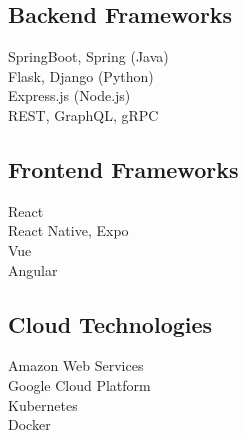 \documentclass[letterpaper]{deedy-resume-openfont} %
\begin{document}
\begin{minipage}[t]{0.24\textwidth}
\sectionsep %

\subsection{Backend Frameworks}
\textbullet{} SpringBoot, Spring (Java)\\
\textbullet{} Flask, Django (Python)\\
\textbullet{} Express.js (Node.js)\\
\textbullet{} REST, GraphQL, gRPC\\

\sectionsep %

\subsection{Frontend Frameworks}
\textbullet{} React\\
\textbullet{} React Native, Expo\\
\textbullet{} Vue\\
\textbullet{} Angular\\

\sectionsep %

\subsection{Cloud Technologies}
\textbullet{} Amazon Web Services\\
\textbullet{} Google Cloud Platform\\
\textbullet{} Kubernetes\\
\textbullet{} Docker\\

\sectionsep %


\end{minipage} %
\hfill
%
%
\end{document}
